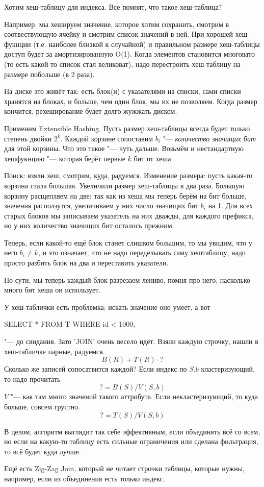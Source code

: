 Хотим хеш-таблицу для индекса.
Все помнят, что такое хеш-таблица?

Например, мы хешируем значение, которое хотим сохранить, смотрим в соотвествующую ячейку и смотрим список значений в ней.
При хорошей хеш-фукнции (т.е. наиболее близкой к случайной) и правильном размере хеш-таблицы доступ будет за амортизированную O(1).
Когда элементов становится многовато (то есть какой-то список стал великоват), надо перестроить хеш-таблицу на размере побольше (в 2 раза).

На диске это живёт так: есть блок(и) с указателями на списки, сами списки хранятся на блоках, и больше, чем один блок, мы их не позволяем.
Когда размер кончится, рехеширование будет долго жужжать диском.

Применим Extensible Hashing.
Пусть размер хеш-таблицы всегда будет только степень двойки $2^k$.
Каждой корзине сопоставим $b_i$ "--- \textit{количество значищих бит} для этой корзины. Что это такое "--- чуть дальше.
Возьмём и нестандартную хешфукнцию "--- которая берёт первые $k$ бит от хеша.

Поиск: взяли хеш, смотрим, куда, радуемся.
Изменение размера: пусть какая-то корзина стала большая.
Увеличили размер хеш-таблицы в два раза.
Большую корзину расщепляем на две: так как из хеша мы теперь берём на бит больше, значения расползутся, увеличиваем у них число значищих бит $b_i$ на 1.
Для всех старых блоков мы записываем указатель на них дважды, для каждого префикса, но у них количество значищих бит осталось прежним.

Теперь, если какой-то ещё блок станет слишком большим, то мы увидим, что у него $b_i \ne k$, и это означает, что не надо переделывать саму хештаблицу, надо просто разбить блок на два и переставить указатели.

По-сути, мы теперь каждый блок разрезаем лениво, помня про него, насколько много бит хеша он использует.

У хеш-таблички есть проблемка: искать значение оно умеет, а вот
\begin{sqlcode}
SELECT * FROM T WHERE id < 1000;
\end{sqlcode}
"--- до свидания.
Зато \sql'JOIN' очень весело идёт.
Взяли каждую строчку, нашли в хеш-табличке парные, радуемся.
\[ B(R) + T(R) \cdot ? \]
Сколько же записей сопосатвится каждой?
Если индекс по $S.b$ кластеризующий, то надо прочитать
\[ ? = B(S) / V(S, b) \]
$V$ "--- как там много значений такого аттрибута.
Если некластеризующий, то куда больше, совсем грустно.
\[ ? = T(S) / V(S, b) \]

В целом, алгоритм выглядит так себе эффективным, если объединять всё со всем, но если на какую-то таблицу есть сильные ограничения или сделана фильтрация, то всё будет куда лучше.

Ещё есть Zig-Zag Join, который не читает строчки таблицы, которые нужны, например, если из объединения есть только индекс.

